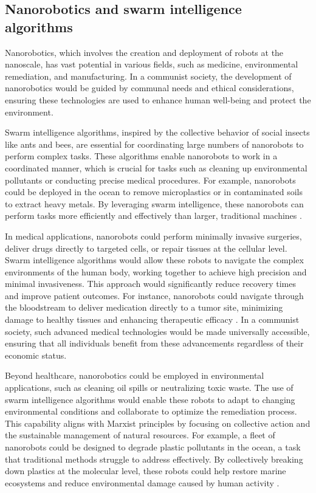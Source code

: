 \subsection{Nanorobotics and swarm intelligence algorithms}

Nanorobotics, which involves the creation and deployment of robots at the nanoscale, has vast potential in various fields, such as medicine, environmental remediation, and manufacturing. In a communist society, the development of nanorobotics would be guided by communal needs and ethical considerations, ensuring these technologies are used to enhance human well-being and protect the environment.

Swarm intelligence algorithms, inspired by the collective behavior of social insects like ants and bees, are essential for coordinating large numbers of nanorobots to perform complex tasks. These algorithms enable nanorobots to work in a coordinated manner, which is crucial for tasks such as cleaning up environmental pollutants or conducting precise medical procedures. For example, nanorobots could be deployed in the ocean to remove microplastics or in contaminated soils to extract heavy metals. By leveraging swarm intelligence, these nanorobots can perform tasks more efficiently and effectively than larger, traditional machines \cite[pp.~220-225]{freitas2005nanomedicine}.

In medical applications, nanorobots could perform minimally invasive surgeries, deliver drugs directly to targeted cells, or repair tissues at the cellular level. Swarm intelligence algorithms would allow these robots to navigate the complex environments of the human body, working together to achieve high precision and minimal invasiveness. This approach would significantly reduce recovery times and improve patient outcomes. For instance, nanorobots could navigate through the bloodstream to deliver medication directly to a tumor site, minimizing damage to healthy tissues and enhancing therapeutic efficacy \cite[pp.~273-280]{freitas1999nanomedicine}. In a communist society, such advanced medical technologies would be made universally accessible, ensuring that all individuals benefit from these advancements regardless of their economic status.

Beyond healthcare, nanorobotics could be employed in environmental applications, such as cleaning oil spills or neutralizing toxic waste. The use of swarm intelligence algorithms would enable these robots to adapt to changing environmental conditions and collaborate to optimize the remediation process. This capability aligns with Marxist principles by focusing on collective action and the sustainable management of natural resources. For example, a fleet of nanorobots could be designed to degrade plastic pollutants in the ocean, a task that traditional methods struggle to address effectively. By collectively breaking down plastics at the molecular level, these robots could help restore marine ecosystems and reduce environmental damage caused by human activity \cite[pp.~301-308]{ratner2003nanotechnology}.

